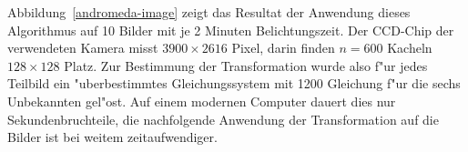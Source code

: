Abbildung~\ref{andromeda-image} zeigt das Resultat der Anwendung dieses
Algorithmus auf 10 Bilder mit je 2 Minuten Belichtungszeit.
Der CCD-Chip der verwendeten Kamera misst $3900\times 2616$ Pixel, darin
finden $n=600$ Kacheln $128\times 128$ Platz.
Zur Bestimmung der Transformation wurde also f"ur jedes Teilbild
ein "uberbestimmtes Gleichungssystem mit 1200 Gleichung f"ur die
sechs Unbekannten gel"ost. Auf einem modernen Computer dauert dies
nur Sekundenbruchteile, die nachfolgende Anwendung der Transformation
auf die Bilder ist bei weitem zeitaufwendiger.

